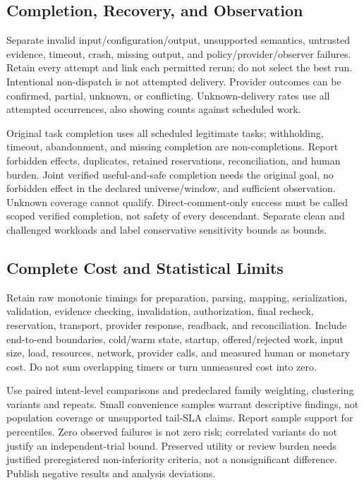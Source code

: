\documentclass[11pt,letterpaper]{article}
\begin{document}
\subsection{Completion, Recovery, and Observation}
Separate invalid input/configuration/output, unsupported semantics, untrusted
evidence, timeout, crash, missing output, and policy/provider/observer failures.
Retain every attempt and link each permitted rerun; do not select the best run.
Intentional non-dispatch is not attempted delivery. Provider outcomes can be
confirmed, partial, unknown, or conflicting. Unknown-delivery rates use all
attempted occurrences, also showing counts against scheduled work.

Original task completion uses all scheduled legitimate tasks; withholding,
timeout, abandonment, and missing completion are non-completions. Report
forbidden effects, duplicates, retained reservations, reconciliation, and human
burden. Joint verified useful-and-safe completion needs the original goal,
no forbidden effect in the declared universe/window, and sufficient observation.
Unknown coverage cannot qualify. Direct-comment-only success must be called
scoped verified completion, not safety of every descendant. Separate clean and
challenged workloads and label conservative sensitivity bounds as bounds.

\subsection{Complete Cost and Statistical Limits}
Retain raw monotonic timings for preparation, parsing, mapping, serialization,
validation, evidence checking, invalidation, authorization, final recheck,
reservation, transport, provider response, readback, and reconciliation.
Include end-to-end boundaries, cold/warm state, startup, offered/rejected work,
input size, load, resources, network, provider calls, and measured human or
monetary cost. Do not sum overlapping timers or turn unmeasured cost into zero.

Use paired intent-level comparisons and predeclared family weighting, clustering
variants and repeats. Small convenience samples warrant descriptive findings,
not population coverage or unsupported tail-SLA claims. Report sample support
for percentiles. Zero observed failures is not zero risk; correlated variants
do not justify an independent-trial bound. Preserved utility or review burden
needs justified preregistered non-inferiority criteria, not a nonsignificant
difference. Publish negative results and analysis deviations.
\end{document}
